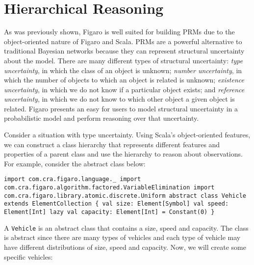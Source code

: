 
\chapter{Hierarchical Reasoning} %

\label{Hierarchical Reasoning} %

As was previously shown, Figaro is well suited for building PRMs due to the object-oriented nature of Figaro and Scala. PRMs are a powerful alternative to traditional Bayesian networks because they can represent structural uncertainty about the model. There are many different types of structural uncertainty: \emph{type uncertainty}, in which the class of an object is unknown; \emph{number uncertainty}, in which the number of objects to which an object is related is unknown; \emph{existence uncertainty}, in which we do not know if a particular object exists; and \emph{reference uncertainty}, in which we do not know to which other object a given object is related. Figaro presents an easy for users to model structural uncertainty in a probabilistic model and perform reasoning over that uncertainty.

Consider a situation with type uncertainty. Using Scala's object-oriented features, we can construct a class hierarchy that represents different features and properties of a parent class and use the hierarchy to reason about observations. For example, consider the abstract class below:

\begin{flushleft}
\texttt{import com.cra.figaro.language.\_
\newline import com.cra.figaro.algorithm.factored.VariableElimination 
\newline import com.cra.figaro.library.atomic.discrete.Uniform
\newline 
\newline abstract class Vehicle extends ElementCollection \{
\newline \tab val size: Element[Symbol]
\newline \tab val speed: Element[Int]
\newline \tab lazy val capacity: Element[Int] = Constant(0)
\newline \}
}
\end{flushleft}

A \texttt{Vehicle} is an abstract class that contains a size, speed and capacity. The class is abstract since there are many types of vehicles and each type of vehicle may have different distributions of size, speed and capacity. Now, we will create some specific vehicles:

